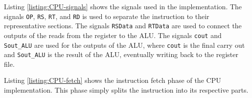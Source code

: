 \documentclass[11pt]{report}
\begin{document}
%
% 

\newpage


Listing \ref{listing:CPU-signals} shows the signals used in the implementation. The signals
\verb|OP|, \verb|RS|, \verb|RT|, and \verb|RD| is used to separate the instruction to their
representative sections. The signals \verb|RSData| and \verb|RTData| are used to connect the outputs
of the reads from the register to the ALU. The signals \verb|cout| and \verb|Sout_ALU| are used for
the outputs of the ALU, where \verb|cout| is the final carry out and \verb|Sout_ALU| is the result
of the ALU, eventually writing back to the register file.


Listing \ref{listing:CPU-fetch} shows the instruction fetch phase of the CPU implementation. This
phase simply splits the instruction into its respective parts.

\newpage

\end{document}
